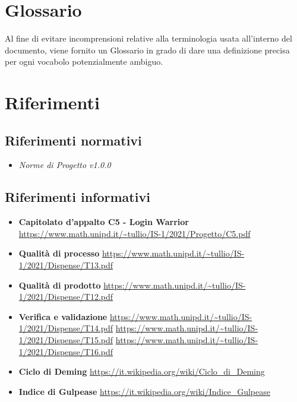 \section{Glossario}
Al fine di evitare incomprensioni relative alla terminologia usata all'interno del documento, viene fornito un Glossario in grado di dare una definizione precisa per ogni vocabolo potenzialmente ambiguo.

\section{Riferimenti}
\subsection{Riferimenti normativi}
\begin{itemize}
  \item \textit{Norme di Progetto v1.0.0}
\end{itemize}
\subsection{Riferimenti informativi}
\begin{itemize}
  \item \textbf{Capitolato d'appalto C5 - Login Warrior}
          \url{https://www.math.unipd.it/~tullio/IS-1/2021/Progetto/C5.pdf}
  \item \textbf{Qualità di processo}
          \url{https://www.math.unipd.it/~tullio/IS-1/2021/Dispense/T13.pdf}
  \item \textbf{Qualità di prodotto}
          \url{https://www.math.unipd.it/~tullio/IS-1/2021/Dispense/T12.pdf}
  \item \textbf{Verifica e validazione}
          \url{https://www.math.unipd.it/~tullio/IS-1/2021/Dispense/T14.pdf}
          \url{https://www.math.unipd.it/~tullio/IS-1/2021/Dispense/T15.pdf}
          \url{https://www.math.unipd.it/~tullio/IS-1/2021/Dispense/T16.pdf}
  \item \textbf{Ciclo di Deming}
          \url{https://it.wikipedia.org/wiki/Ciclo_di_Deming}
  \item \textbf{Indice di Gulpease}
          \url{https://it.wikipedia.org/wiki/Indice_Gulpease}
\end{itemize}
